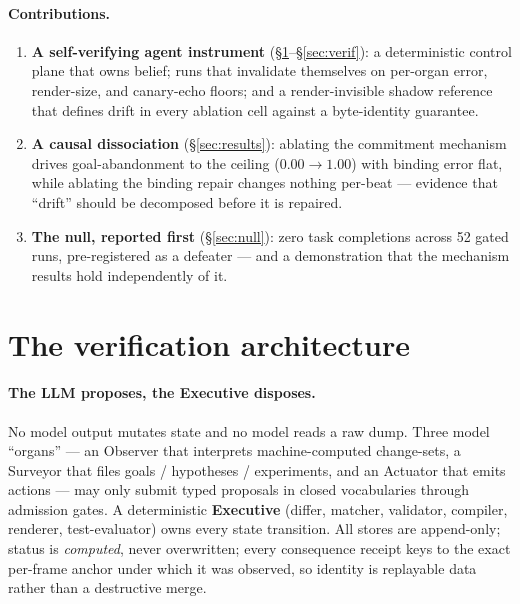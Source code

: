 \documentclass{article}
\begin{document}
\paragraph{Contributions.}
\begin{enumerate}
\item \textbf{A self-verifying agent instrument} (\S\ref{sec:arch}--\S\ref{sec:verif}):
a deterministic control plane that owns belief; runs that invalidate themselves on
per-organ error, render-size, and canary-echo floors; and a render-invisible
shadow reference that defines drift in every ablation cell against a byte-identity
guarantee.
\item \textbf{A causal dissociation} (\S\ref{sec:results}): ablating the
commitment mechanism drives goal-abandonment to the ceiling ($0.00\!\to\!1.00$)
with binding error flat, while ablating the binding repair changes nothing
per-beat --- evidence that ``drift'' should be decomposed before it is repaired.
\item \textbf{The null, reported first} (\S\ref{sec:null}): zero task
completions across 52 gated runs, pre-registered as a defeater --- and a
demonstration that the mechanism results hold independently of it.
\end{enumerate}

\section{The verification architecture}
\label{sec:arch}

\paragraph{The LLM proposes, the Executive disposes.} No model output mutates state
and no model reads a raw dump. Three model ``organs'' --- an Observer that
interprets machine-computed change-sets, a Surveyor that files goals / hypotheses /
experiments, and an Actuator that emits actions --- may only submit typed proposals
in closed vocabularies through admission gates. A deterministic \textbf{Executive}
(differ, matcher, validator, compiler, renderer, test-evaluator) owns every state
transition. All stores are append-only; status is \emph{computed}, never
overwritten; every consequence receipt keys to the exact per-frame anchor under
which it was observed, so identity is replayable data rather than a destructive
merge.
\end{document}

